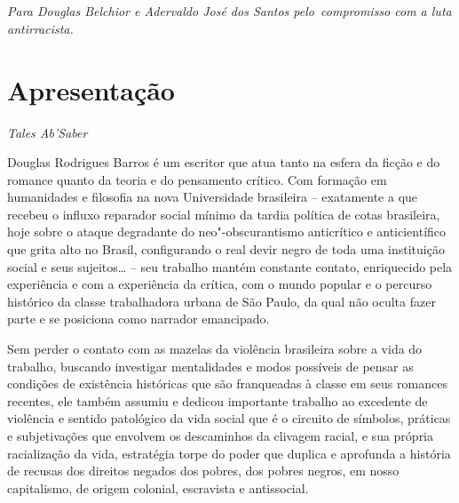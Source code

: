 \chapter*{}

\vfill
\begin{flushright}
\emph{Para Douglas Belchior e Adervaldo José dos Santos pelo~compromisso
com a luta antirracista.}
\end{flushright}
\thispagestyle{empty}

\chapter*{Apresentação}

\begin{flushright}
\emph{Tales Ab'Saber}
\end{flushright}

Douglas Rodrigues Barros é um escritor que atua tanto na esfera da
ficção e do romance quanto da teoria e do pensamento crítico. Com
formação em humanidades e filosofia na nova Universidade brasileira --
exatamente a que recebeu o influxo reparador social mínimo da tardia
política de cotas brasileira, hoje sobre o ataque degradante do
neo"-obscurantismo anticrítico e anticientífico que grita alto no Brasil,
configurando o real devir negro de toda uma instituição social e seus
sujeitos\ldots{} -- seu trabalho mantém constante contato, enriquecido pela
experiência e com a experiência da crítica, com o mundo popular e o
percurso histórico da classe trabalhadora urbana de São Paulo, da qual
não oculta fazer parte e se posiciona como narrador emancipado.

Sem perder o contato com as mazelas da violência brasileira sobre a vida
do trabalho, buscando investigar mentalidades e modos possíveis de
pensar as condições de existência históricas que são franqueadas à
classe em seus romances recentes, ele também assumiu e dedicou
importante trabalho ao excedente de violência e sentido patológico da
vida social que é o circuito de símbolos, práticas e subjetivações que
envolvem os descaminhos da clivagem racial, e sua própria racialização
da vida, estratégia torpe do poder que duplica e aprofunda a história de
recusas dos direitos negados dos pobres, dos pobres negros, em nosso
capitalismo, de origem colonial, escravista e antissocial.

